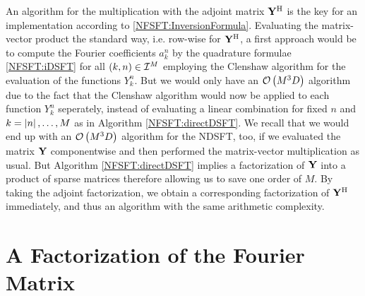 An algorithm for the multiplication with the adjoint matrix $\mathbf{Y}^{\text{\rm{H}}}$ is the key for an implementation according to \eqref{NFSFT:InversionFormula}. Evaluating the matrix-vector product the standard way, i.e. row-wise for $\mathbf{Y}^{\text{\rm{H}}}$, a first approach would be to compute the Fourier coefficients $a_{k}^n$ by the quadrature formulae \eqref{NFSFT:iDSFT} for all $\left(k,n\right) \in \mathcal{I}^M$ employing the Clenshaw algorithm for the evaluation of the functions $Y_{k}^n$. But we would only have an $\mathcal{O}\left(M^3 D\right)$ algorithm due to the fact that the Clenshaw algorithm would now be applied to each function $Y_{k}^n$ seperately, instead of evaluating a linear combination for fixed $n$ and $k = \left\vert n\right\vert,\dots,M$ as in Algorithm \ref{NFSFT:directDSFT}. We recall that we would end up with an $\mathcal{O}\left(M^3 D\right)$ algorithm for the NDSFT, too, if we evaluated the matrix $\mathbf{Y}$ componentwise and then performed the matrix-vector multiplication as usual. But Algorithm \ref{NFSFT:directDSFT} implies a factorization of $\mathbf{Y}$ into a product of sparse matrices therefore allowing us to save one order of $M$. By taking the adjoint factorization, we obtain a corresponding factorization of $\mathbf{Y}^{\text{\rm{H}}}$ immediately, and thus an algorithm with the same arithmetic complexity.

\section{A Factorization of the Fourier Matrix}

